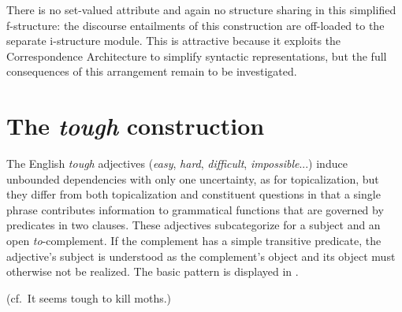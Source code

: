 \documentclass[output=paper,hidelinks]{langscibook}
\begin{document}
\noindent There is no set-valued \FOCUS attribute and again no structure sharing in this simplified f-structure: the discourse entailments of this construction are off-loaded to the separate i-structure module.  This is attractive because it exploits the Correspondence Architecture to simplify syntactic representations, but the full consequences of this arrangement remain to be investigated.

%
%


\section{The \textit{tough} construction}\label{tough}

The English \textit{tough} adjectives (\textit{easy}, \textit{hard}, \textit{difficult}, \textit{impossible}...) induce unbounded dependencies with only one uncertainty, as for topicalization, but they differ from both topicalization and constituent questions in that a single phrase contributes information to grammatical functions that are governed by predicates in two clauses.  These adjectives subcategorize for a subject and an open \textit{to}-comple\-ment. If the complement has a simple transitive predicate, the adjective's subject is understood as the complement's object and its object must otherwise not be realized. The basic pattern is displayed in . 

\ea\label{seem}
\label{seema} 
\sn       \hsp{1.5em} (cf.\ It seems tough to kill moths.)
\label{seemb}
\label{seemc}
\label{seemd}
\z\z

 
\end{document}
